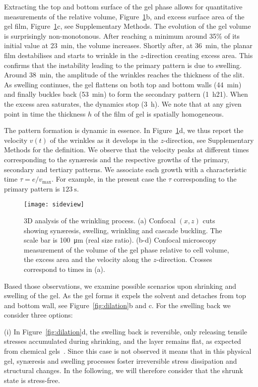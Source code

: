 \documentclass[twocolumn,superscriptaddress,showpacs,preprintnumbers,
amsmath,amssymb,prl]{revtex4-1}
\begin{document}
Extracting the top and bottom surface of the gel phase allows for quantitative measurements of the relative volume, Figure~\ref{fig:sideview}b, and excess surface area of the gel film, Figure~\ref{fig:sideview}c, see Supplementary Methods. The evolution of the gel volume is surprisingly non-monotonous. After reaching a minimum around 35\% of its initial value at \SI{23}{\minute}, the volume increases. Shortly after, at \SI{36}{\minute}, the planar film destabilises and starts to wrinkle in the $z$-direction creating excess area. This confirms that the instability leading to the primary pattern is due to swelling. Around \SI{38}{\minute}, the amplitude of the wrinkles reaches the thickness of the slit. As swelling continues, the gel flattens on both top and bottom walls (\SI{44}{\minute}) and finally buckles back (\SI{53}{\minute}) to form the secondary pattern (\SI{1}{\hour}21). When the excess area saturates, the dynamics stop (\SI{3}{\hour}). We note that at any given point in time the thickness $h$ of the film of gel is spatially homogeneous.

The pattern formation is dynamic in essence. In Figure~\ref{fig:sideview}d, we thus report the velocity $v(t)$ of the wrinkles as it develops in the $z$-direction, see Supplementary Methods for the definition. We observe that the velocity peaks at different times corresponding to the syn\ae{}resis and the respective growths of the primary, secondary and tertiary patterns. We associate each growth with a characteristic time $\tau = e/v_\text{max}$. For example, in the present case the $\tau$ corresponding to the primary pattern is $\SI{123}{\second}$.


\begin{figure}
	\texttt{[image: sideview]}
	\caption{3D analysis of the wrinkling process. (a) Confocal $(x,z)$ cuts showing syn\ae{}resis, swelling, wrinkling and cascade buckling. The scale bar is \SI{100}{\micro\metre} (real size ratio). (b-d) Confocal microscopy measurement of the volume of the gel phase relative to cell volume, the excess area and the velocity along the $z$-direction. Crosses correspond to times in (a).}
	\label{fig:sideview}
\end{figure}

Based those observations, we examine possible scenarios upon shrinking and swelling of the gel. As the gel forms it expels the solvent and detaches from top and bottom wall, see Figure~\ref{fig:dilation}b and c. For the swelling back we consider three options: 

\noindent
(i) In Figure~\ref{fig:dilation}d, the swelling back is reversible, only releasing tensile stresses accumulated during shrinking, and the layer remains flat, as expected from chemical gels~\cite{Kim2010}. Since this case is not observed it means that in this physical gel, syn\ae{}resis and swelling processes foster irreversible stress dissipation and structural changes. In the following, we will therefore consider that the shrunk state is stress-free. 
\end{document}
